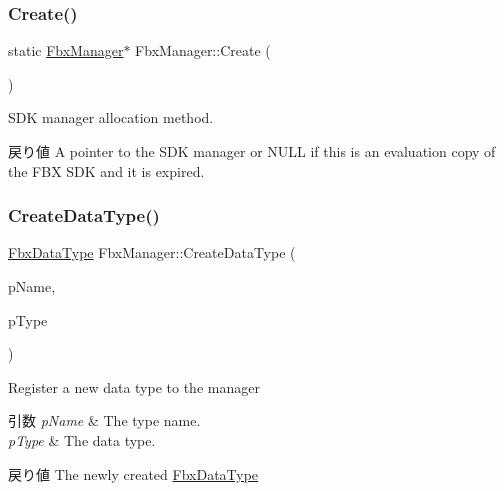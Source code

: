 \subsubsection{\texorpdfstring{Create()}{Create()}}
{\footnotesize\ttfamily static \hyperlink{class_fbx_manager}{Fbx\+Manager}$\ast$ Fbx\+Manager\+::\+Create (\begin{DoxyParamCaption}{ }\end{DoxyParamCaption})\hspace{0.3cm}{\ttfamily [static]}}

S\+DK manager allocation method. \begin{DoxyReturn}{戻り値}
A pointer to the S\+DK manager or {\ttfamily N\+U\+LL} if this is an evaluation copy of the F\+BX S\+DK and it is expired. 
\end{DoxyReturn}
\mbox{\label{class_fbx_manager_a832d8b98c57a7781bc736bb49c131bb6}} 
\subsubsection{\texorpdfstring{Create\+Data\+Type()}{CreateDataType()}}
{\footnotesize\ttfamily \hyperlink{class_fbx_data_type}{Fbx\+Data\+Type} Fbx\+Manager\+::\+Create\+Data\+Type (\begin{DoxyParamCaption}\item[{const char $\ast$}]{p\+Name,  }\item[{const \hyperlink{fbxpropertytypes_8h_a73913a5ddfb20e57c6f25e9e6784bd92}{E\+Fbx\+Type}}]{p\+Type }\end{DoxyParamCaption})}

Register a new data type to the manager 
\begin{DoxyParams}{引数}
{\em p\+Name} & The type name. \\
\hline
{\em p\+Type} & The data type. \\
\hline
\end{DoxyParams}
\begin{DoxyReturn}{戻り値}
The newly created \hyperlink{class_fbx_data_type}{Fbx\+Data\+Type} 
\end{DoxyReturn}
\mbox{\label{class_fbx_manager_a835e4e738e31eafa937b6fbd4b548804}} 
